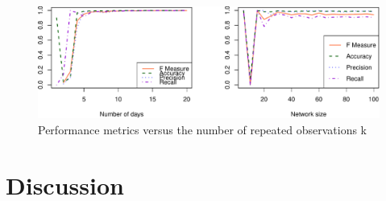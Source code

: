 \documentclass[]{article}
\begin{document}
\begin{figure}[H]

{\centering \includegraphics{report_files/figure-latex/unnamed-chunk-6-1} 

}

\caption{\label{fig:figs}Performance metrics versus the number of repeated observations k}\label{fig:unnamed-chunk-6}
\end{figure}

\hypertarget{discussion}{%
\section{Discussion}\label{discussion}}

\nocite{
morris2008specification,
eagle2006reality,
everitt2012bayesian,
korber2018bayesian,
jin2013bayesian,
newman2018network,
koskinen2010analysing,
everitt2017marginal,
murray2012mcmc,
hunter2006,
park2018bayesian,
strauss1990pseudolikelihood,
snijders2002markov,
schmid2017exponential}


\end{document}
